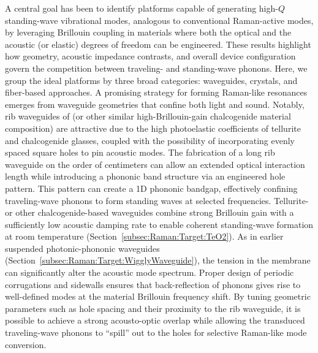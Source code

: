 A central goal has been to identify platforms capable of generating high-\(Q\) standing-wave vibrational modes, analogous to conventional Raman-active modes, by leveraging Brillouin coupling in materials where both the optical and the acoustic (or elastic) degrees of freedom can be engineered. These results highlight how geometry, acoustic impedance contrasts, and overall device configuration govern the competition between traveling- and standing-wave phonons. Here, we group the ideal platforms by three broad categories: waveguides,  crystals, and fiber-based approaches. A promising strategy for forming Raman-like resonances emerges from waveguide geometries that confine both light and sound. Notably, rib waveguides of  (or other similar high-Brillouin-gain chalcogenide material composition) are attractive due to the high photoelastic coefficients of tellurite and chalcogenide glasses, coupled with the possibility of incorporating evenly spaced square holes to pin acoustic modes. The fabrication of a long rib waveguide on the order of centimeters can allow an extended optical interaction length while introducing a phononic band structure via an engineered hole pattern. This pattern can create a 1D phononic bandgap, effectively confining traveling-wave phonons to form standing waves at selected frequencies. Tellurite- or other chalcogenide-based waveguides combine strong Brillouin gain with a sufficiently low acoustic damping rate to enable coherent standing-wave formation at room temperature (Section~\ref{subsec:Raman:Target:TeO2}). As in earlier suspended photonic-phononic waveguides (Section~\ref{subsec:Raman:Target:WigglyWaveguide}), the tension in the membrane can significantly alter the acoustic mode spectrum. Proper design of periodic corrugations and sidewalls ensures that back-reflection of phonons gives rise to well-defined modes at the material Brillouin frequency shift. By tuning geometric parameters such as hole spacing and their proximity to the rib waveguide, it is possible to achieve a strong acousto-optic overlap while allowing the transduced traveling-wave phonons to ``spill'' out to the holes for selective Raman-like mode conversion.

